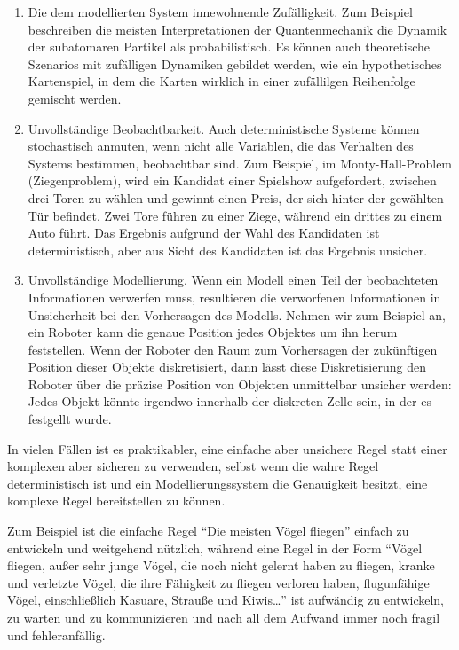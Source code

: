 \begin{enumerate}

\item Die dem modellierten System innewohnende Zufälligkeit. Zum Beispiel beschreiben die meisten Interpretationen der Quantenmechanik die Dynamik der subatomaren Partikel als probabilistisch. Es können auch theoretische Szenarios mit zufälligen Dynamiken gebildet werden, wie ein hypothetisches Kartenspiel, in dem die Karten wirklich in einer zufällilgen Reihenfolge gemischt werden.

\item Unvollständige Beobachtbarkeit. Auch deterministische Systeme können stochastisch anmuten, wenn nicht alle Variablen, die das Verhalten des Systems bestimmen, beobachtbar sind. Zum Beispiel, im Monty-Hall-Problem (Ziegenproblem), wird ein Kandidat einer Spielshow aufgefordert, zwischen drei Toren zu wählen und gewinnt einen Preis, der sich hinter der gewählten Tür befindet. Zwei Tore führen zu einer Ziege, während ein drittes zu einem Auto führt. Das Ergebnis aufgrund der Wahl des Kandidaten ist deterministisch, aber aus Sicht des Kandidaten ist das Ergebnis unsicher.

\item Unvollständige Modellierung. Wenn ein Modell einen Teil der beobachteten Informationen verwerfen muss, resultieren die verworfenen Informationen in Unsicherheit bei den Vorhersagen des Modells. Nehmen wir zum Beispiel an, ein Roboter kann die genaue Position jedes Objektes um ihn herum feststellen. Wenn der Roboter den Raum zum Vorhersagen der zukünftigen Position dieser Objekte diskretisiert, dann lässt diese Diskretisierung den Roboter über die präzise Position von Objekten unmittelbar unsicher werden: Jedes Objekt könnte irgendwo innerhalb der diskreten Zelle sein, in der es festgellt wurde.

\end{enumerate}

In vielen Fällen ist es praktikabler, eine einfache aber unsichere Regel statt einer komplexen aber sicheren zu verwenden, selbst wenn die wahre Regel deterministisch ist und ein Modellierungssystem die Genauigkeit besitzt, eine komplexe Regel bereitstellen zu können.

Zum Beispiel ist die einfache Regel ``Die meisten Vögel fliegen'' einfach zu entwickeln und weitgehend nützlich, während eine Regel in der Form ``Vögel fliegen, außer sehr junge Vögel, die noch nicht gelernt haben zu fliegen, kranke und verletzte Vögel, die ihre Fähigkeit zu fliegen verloren haben, flugunfähige Vögel, einschließlich Kasuare, Strauße und Kiwis\dots'' ist aufwändig zu entwickeln, zu warten und zu kommunizieren und nach all dem Aufwand immer noch fragil und fehleranfällig.

